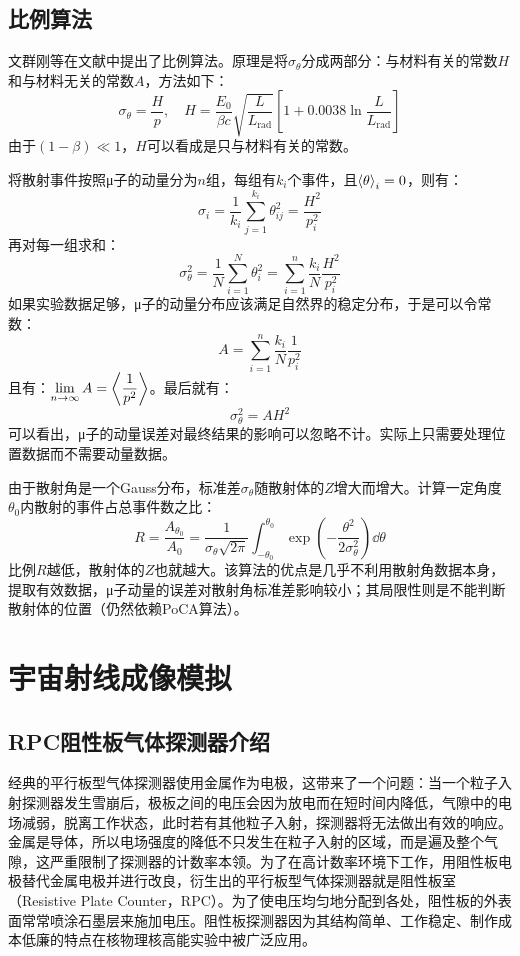 \documentclass[fontset=none,zihao=-4]{ctexart}
\begin{document}
\subsection{比例算法}

文群刚等在文献\cite{liu2020study}中提出了比例算法。原理是将$\sigma_\theta$分成两部分：与材料有关的常数$H$和与材料无关的常数$A$，方法如下：
\[
    \sigma_\theta = \frac{H}{p},\quad H = \frac{E_0}{\beta c} \sqrt{\frac{L}{L_{\mathrm{rad}}}} \left[1 + 0.0038\ln\frac{L}{L_{\mathrm{rad}}}\right]
\]
由于$(1-\beta) \ll 1$，$H$可以看成是只与材料有关的常数。

将散射事件按照μ子的动量分为$n$组，每组有$k_i$个事件，且$\expval{\theta}_i = 0$，则有：
\[
    \sigma_i = \frac{1}{k_i}\sum_{j=1}^{k_i} \theta_{ij}^2 = \frac{H^2}{p_i^2}
\]
再对每一组求和：
\[
    \sigma_\theta^2 = \frac{1}{N}\sum_{i=1}^N \theta_i^2 = \sum_{i=1}^n \frac{k_i}{N}\frac{H^2}{p_i^2}
\]
如果实验数据足够，μ子的动量分布应该满足自然界的稳定分布，于是可以令常数：
\[
    A = \sum_{i=1}^n \frac{k_i}{N}\frac{1}{p_i^2}
\]
且有：$\lim\limits_{n \to \infty} A = \expval{\dfrac{1}{p^2}}$。最后就有：
\[
    \sigma_\theta^2 = AH^2
\]
可以看出，μ子的动量误差对最终结果的影响可以忽略不计。实际上只需要处理位置数据而不需要动量数据。

由于散射角是一个Gauss分布，标准差$\sigma_\theta$随散射体的$Z$增大而增大。计算一定角度$\theta_0$内散射的事件占总事件数之比：
\[
    R = \frac{A_{\theta_0}}{A_0} = \frac{1}{\sigma_\theta\sqrt{2\pi}} \int_{-\theta_0}^{\theta_0} \exp(-\frac{\theta^2}{2\sigma_\theta^2}) \dd{\theta}
\]
比例$R$越低，散射体的$Z$也就越大。该算法的优点是几乎不利用散射角数据本身，提取有效数据，μ子动量的误差对散射角标准差影响较小；其局限性则是不能判断散射体的位置（仍然依赖PoCA算法）。

\clearpage
\section{宇宙射线成像模拟}

\subsection{RPC阻性板气体探测器介绍}

经典的平行板型气体探测器使用金属作为电极，这带来了一个问题：当一个粒子入射探测器发生雪崩后，极板之间的电压会因为放电而在短时间内降低，气隙中的电场减弱，脱离工作状态，此时若有其他粒子入射，探测器将无法做出有效的响应。金属是导体，所以电场强度的降低不只发生在粒子入射的区域，而是遍及整个气隙，这严重限制了探测器的计数率本领。为了在高计数率环境下工作，用阻性板电极替代金属电极并进行改良，衍生出的平行板型气体探测器就是阻性板室（Resistive Plate Counter，RPC）。为了使电压均匀地分配到各处，阻性板的外表面常常喷涂石墨层来施加电压。阻性板探测器因为其结构简单、工作稳定、制作成本低廉的特点在核物理核高能实验中被广泛应用。
\end{document}

